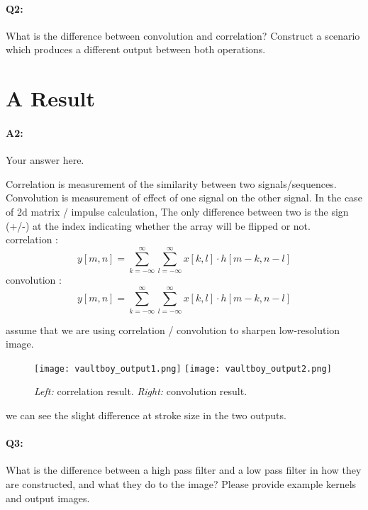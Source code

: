 	
	
	\pagebreak
	\paragraph{Q2:} What is the difference between convolution and correlation? Construct a scenario which produces a different output between both operations.
	
	\section*{A Result}
	\paragraph{A2:} Your answer here.
	
	Correlation is measurement of the similarity between two signals/sequences. Convolution is measurement of effect of one signal on the other signal. In the case of 2d matrix / impulse calculation, The only difference between two is the sign (+/-) at the index indicating whether the array will be flipped or not.
	\\correlation :
	\[
	y[m,n] = \sum_{k=-\infty}^{\infty} \sum_{l=-\infty}^{\infty} x[k,l] \cdot h[m-k, n-l]
	\]
	convolution : 
	\[
	y[m,n] = \sum_{k=-\infty}^{\infty} \sum_{l=-\infty}^{\infty} x[k,l] \cdot h[m-k, n-l]
	\]

	assume that we are using correlation / convolution to sharpen low-resolution image.
	\begin{figure}[h!]
		\centering
		\texttt{[image: vaultboy\_output1.png]}
		\texttt{[image: vaultboy\_output2.png]}
		\caption{\emph{Left:} correlation result. \emph{Right:} convolution result.}
		\label{fig:result1}
	\end{figure}

	we can see the slight difference at stroke size in the two outputs.
	
	\pagebreak
		\paragraph{Q3:} What is the difference between a high pass filter and a low pass filter in how they are constructed, and what they do to the image? Please provide example kernels and output images.
		
